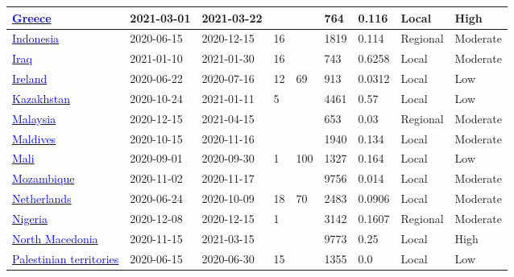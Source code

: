 \begin{table}[ht]
\begin{center}
\begin{tabular}{p{2cm} | p{1.6cm} | p{1.6cm} | p{0.8cm} | p{0.8cm} | p{1cm} | p{1.3cm} | p{1.2cm} | p{1.2cm}}
\hline 
\href{https://dx.doi.org/10.1002/jmv.27465}{\textcolor{blue}{Greece}} & 2021-03-01 & 2021-03-22 &  &  & 764 & 0.116 & Local & High \\ 
\hline 
\href{https://journals.plos.org/plosone/article?id=10.1371/journal.pone.0251234}{\textcolor{blue}{Indonesia}} & 2020-06-15 & 2020-12-15 & 16 &  & 1819 & 0.114 & Regional & Moderate \\ 
\hline 
\href{10.1101/2021.03.23.21254169}{\textcolor{blue}{Iraq}} & 2021-01-10 & 2021-01-30 & 16 &  & 743 & 0.6258 & Local & Moderate \\ 
\hline 
\href{https://dx.doi.org/10.2807/1560-7917.ES.2021.26.48.2001741}{\textcolor{blue}{Ireland}} & 2020-06-22 & 2020-07-16 & 12 & 69 & 913 & 0.0312 & Local & Low \\ 
\hline 
\href{https://dx.doi.org/10.1002/hsr2.562}{\textcolor{blue}{Kazakhstan}} & 2020-10-24 & 2021-01-11 & 5 &  & 4461 & 0.57 & Local & Low \\ 
\hline 
\href{https://dx.doi.org/10.1002/jmv.27441}{\textcolor{blue}{Malaysia}} & 2020-12-15 & 2021-04-15 &  &  & 653 & 0.03 & Regional & Moderate \\ 
\hline 
\href{https://apjai-journal.org/wp-content/uploads/2022/01/AP-040721-1177.pdf}{\textcolor{blue}{Maldives}} & 2020-10-15 & 2020-11-16 &  &  & 1940 & 0.134 & Local & Moderate \\ 
\hline 
\href{https://doi.org/10.1101/2022.06.03.22275924}{\textcolor{blue}{Mali}} & 2020-09-01 & 2020-09-30 & 1 & 100 & 1327 & 0.164 & Local & Low \\ 
\hline 
\href{https://covid19.ins.gov.mz/wp-content/uploads/2020/11/Inqueirito-SE-SARS-CoV-2-de-Cidade-de-Chimoio-Resultados-preliminares-27-Nov-2020-V\_1.1\_corrigido-I\_JANI\_FINAL1.pdf}{\textcolor{blue}{Mozambique}} & 2020-11-02 & 2020-11-17 &  &  & 9756 & 0.014 & Local & Moderate \\ 
\hline 
\href{https://dx.doi.org/10.1136/bmjopen-2021-052752}{\textcolor{blue}{Netherlands}} & 2020-06-24 & 2020-10-09 & 18 & 70 & 2483 & 0.0906 & Local & Moderate \\ 
\hline 
\href{https://www.sciencedirect.com/science/article/pii/S1201971221005968}{\textcolor{blue}{Nigeria}} & 2020-12-08 & 2020-12-15 & 1 &  & 3142 & 0.1607 & Regional & Moderate \\ 
\hline 
\href{http://dx.doi.org/10.1111/vox.13117}{\textcolor{blue}{North Macedonia}} & 2020-11-15 & 2021-03-15 &  &  & 9773 & 0.25 & Local & High \\ 
\hline 
\href{https://bmjopen.bmj.com/content/11/2/e044552}{\textcolor{blue}{Palestinian territories}} & 2020-06-15 & 2020-06-30 & 15 &  & 1355 & 0.0 & Local & Low \\ 

\end{tabular}
\end{center}
\end{table}
